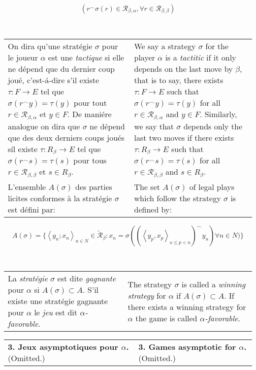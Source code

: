 \documentclass[12pt]{article}
\theoremstyle{plain}
\theoremstyle{definition}
\theoremstyle{remark}
\begin{document}
\[ (r^\frown\sigma(r) \in \mathcal{R}_{\beta,\alpha}, \forall r \in \mathcal{R}_{\beta,\beta})\]

\

\begin{tabular}{p{2.8in} p{2.8in}}
On dira qu'une strat\'egie $\sigma$ pour le joueur $\alpha$ est une \textit{tactique} si elle ne d\'epend que du dernier coup jou\'e, c'est-\'a-dire s'il existe $\tau: F \to E$ tel que $\sigma(r^\frown y) = \tau(y)$ pour tout $r \in \mathcal{R}_{\beta,\alpha}$ et $y \in F$. De mani\'ere analogue on dira que $\sigma$ ne d\'epend que des deux derniers coups jou\'es s\'il existe $\tau: R_\beta \to E$ tel que $\sigma(r^\frown s) = \tau(s)$ pour tous $r \in \mathcal{R}_{\beta,\beta}$ et $s \in R_\beta$.
&
We say a strategy $\sigma$ for the player $\alpha$ is a \textit{tactitic} if it only depends on the last move by $\beta$, that is to say, there exists $\tau: F \to E$ such that $\sigma(r^\frown y) = \tau(y)$ for all $r \in \mathcal{R}_{\beta,\alpha}$ and $y\in F$. Similarly, we say that $\sigma$ depends only the last two moves if there exists $\tau: R_\beta \to E$ such that $\sigma(r^\frown s) = \tau(s)$ for all $r \in \mathcal{R}_{\beta,\beta}$ and $s \in R_\beta$.

\\

L'ensemble $A(\sigma)$ des parties licites conformes \`a la strat\'egie $\sigma$ est d\'efini par:

&

The set $A(\sigma)$ of legal plays which follow the strategy $\sigma$ is defined by:
\end{tabular}

\[A(\sigma) = \{\left<y_n;x_n\right>_{n\in N} \in \widetilde{\mathcal{R}}_\beta : x_n = \sigma((\left<y_p,x_p\right>_{o\leq p < n})^\frown y_n) \forall n\in N)\}\]

\

\begin{tabular}{p{2.8in} p{2.8in}}
La \textit{strat\'egie} $\sigma$ est dite \textit{gagnante} pour $\alpha$ si $A(\sigma) \subset A$. S'il existe une strat\'egie gagnante pour $\alpha$ le \textit{jeu} est dit \textit{$\alpha$-favorable}.
&
The strategy $\sigma$ is called a \textit{winning strategy} for $\alpha$ if $A(\sigma) \subset A$. If there exists a winning strategy for $\alpha$ the game is called \textit{$\alpha$-favorable}.
\end{tabular}



\begin{tabular}{p{2.8in} p{2.8in}}
\textbf{3. Jeux asymptotiques pour $\alpha$.} (Omitted.)
&
\textbf{3. Games asymptotic for $\alpha$.} (Omitted.)
\end{tabular}
\end{document}
